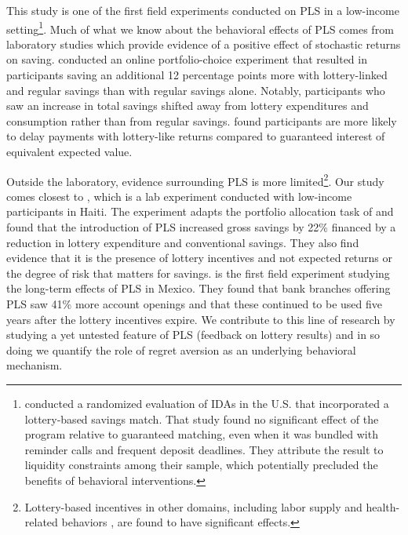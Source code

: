 \documentclass[11pt]{article}
\begin{document}
	This study is one of the first field experiments conducted on PLS in a low-income setting\footnote{\textcite{loibl_testing_2016} conducted a randomized evaluation of IDAs in the U.S. that incorporated a lottery-based savings match. That study found no significant effect of the program relative to guaranteed matching, even when it was bundled with reminder calls and frequent deposit deadlines. They attribute the result to liquidity constraints among their sample, which potentially precluded the benefits of behavioral interventions.}. Much of what we know about the behavioral effects of PLS comes from laboratory studies which provide evidence of a positive effect of stochastic returns on saving. \textcite{atalay_savings_2014} conducted an online portfolio-choice experiment that resulted in participants saving an additional 12 percentage points more with lottery-linked and regular savings than with regular savings alone. Notably, participants who saw an increase in total savings shifted away from lottery expenditures and consumption rather than from regular savings. \textcite{filiz-ozbay_lottery_2015} found participants are more likely to delay payments with lottery-like returns compared to guaranteed interest of equivalent expected value.

	Outside the laboratory, evidence surrounding PLS is more limited\footnote{Lottery-based incentives in other domains, including labor supply \parencite{brune_effect_2015} and health-related behaviors \parencite{kimmel_randomized_2012,bjorkman_nyqvist_using_2015}, are found to have significant effects.}. Our study comes closest to \textcite{dizon_leveraging_2016}, which is a lab experiment conducted with low-income participants in Haiti. The experiment adapts the portfolio allocation task of \textcite{atalay_savings_2014} and found that the introduction of PLS increased gross savings by 22\% financed by a reduction in lottery expenditure and conventional savings. They also find evidence that it is the presence of lottery incentives and not expected returns or the degree of risk that matters for savings. \textcite{gertler_long-term_2017} is the first field experiment studying the long-term effects of PLS in Mexico. They found that bank branches offering PLS saw 41\% more account openings and that these continued to be used five years after the lottery incentives expire. We contribute to this line of research by studying a yet untested feature of PLS (feedback on lottery results) and in so doing we quantify the role of regret aversion as an underlying behavioral mechanism.
\end{document}
